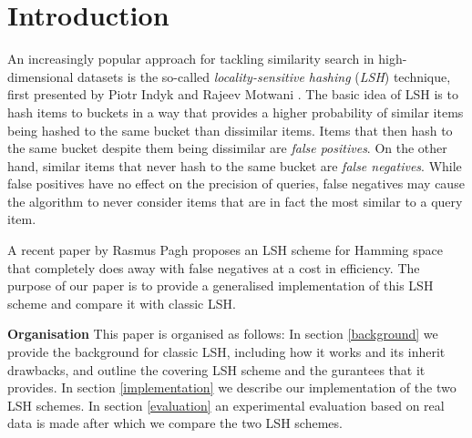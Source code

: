 \section{Introduction}
\label{introduction}

An increasingly popular approach for tackling similarity search in high-dimensional datasets is the so-called \textit{locality-sensitive hashing} (\textit{LSH}) technique, first presented by Piotr Indyk and Rajeev Motwani \cite{DBLP:conf/stoc/IndykM98}. The basic idea of LSH is to hash items to buckets in a way that provides a higher probability of similar items being hashed to the same bucket than dissimilar items. Items that then hash to the same bucket despite them being dissimilar are \textit{false positives}. On the other hand, similar items that never hash to the same bucket are \textit{false negatives}. While false positives have no effect on the precision of queries, false negatives may cause the algorithm to never consider items that are in fact the most similar to a query item.

A recent paper by Rasmus Pagh \cite{DBLP:journals/corr/Pagh15} proposes an LSH scheme for Hamming space that completely does away with false negatives at a cost in efficiency. The purpose of our paper is to provide a generalised implementation of this LSH scheme and compare it with classic LSH.

\textbf{Organisation} This paper is organised as follows: In section \ref{background} we provide the background for classic LSH, including how it works and its inherit drawbacks, and outline the covering LSH scheme and the gurantees that it provides. In section \ref{implementation} we describe our implementation of the two LSH schemes. In section \ref{evaluation} an experimental evaluation based on real data is made after which we compare the two LSH schemes.
